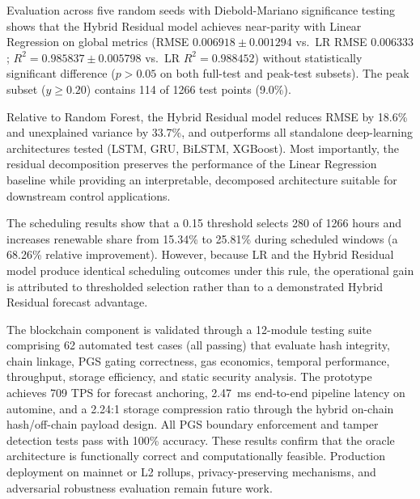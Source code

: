\documentclass{ieeeaccess}
\begin{document}
Evaluation across five random seeds with Diebold-Mariano significance testing shows that the Hybrid Residual model achieves near-parity with Linear Regression on global metrics (RMSE $0.006918 \pm 0.001294$ vs.\ LR RMSE $0.006333$; $R^2 = 0.985837 \pm 0.005798$ vs.\ LR $R^2 = 0.988452$) without statistically significant difference ($p > 0.05$ on both full-test and peak-test subsets). The peak subset ($y \ge 0.20$) contains 114 of 1266 test points (9.0\%).

Relative to Random Forest, the Hybrid Residual model reduces RMSE by 18.6\% and unexplained variance by 33.7\%, and outperforms all standalone deep-learning architectures tested (LSTM, GRU, BiLSTM, XGBoost). Most importantly, the residual decomposition preserves the performance of the Linear Regression baseline while providing an interpretable, decomposed architecture suitable for downstream control applications.

The scheduling results show that a 0.15 threshold selects 280 of 1266 hours and increases renewable share from 15.34\% to 25.81\% during scheduled windows (a 68.26\% relative improvement). However, because LR and the Hybrid Residual model produce identical scheduling outcomes under this rule, the operational gain is attributed to thresholded selection rather than to a demonstrated Hybrid Residual forecast advantage.

The blockchain component is validated through a 12-module testing suite comprising 62 automated test cases (all passing) that evaluate hash integrity, chain linkage, PGS gating correctness, gas economics, temporal performance, throughput, storage efficiency, and static security analysis. The prototype achieves 709 TPS for forecast anchoring, 2.47~ms end-to-end pipeline latency on automine, and a 2.24:1 storage compression ratio through the hybrid on-chain hash/off-chain payload design. All PGS boundary enforcement and tamper detection tests pass with 100\% accuracy. These results confirm that the oracle architecture is functionally correct and computationally feasible. Production deployment on mainnet or L2 rollups, privacy-preserving mechanisms, and adversarial robustness evaluation remain future work.
\end{document}
